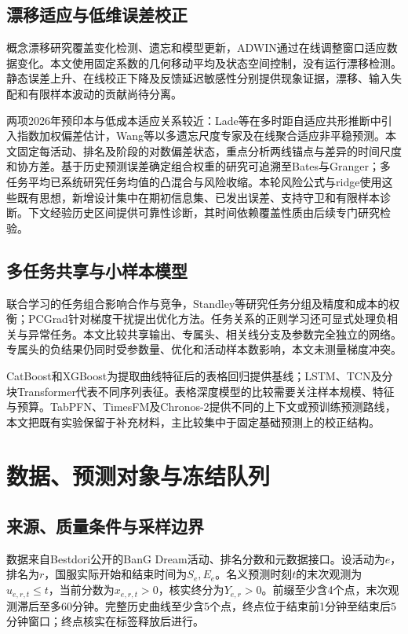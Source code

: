 \documentclass[preprint,12pt]{elsarticle}
\begin{document}
\subsection{漂移适应与低维误差校正}
概念漂移研究覆盖变化检测、遗忘和模型更新\citep{gama2014drift}，ADWIN通过在线调整窗口适应数据变化\citep{bifet2007adwin}。本文使用固定系数的几何移动平均\citep{roberts1959ewma}及状态空间控制\citep{kalman1960filter}，没有运行漂移检测。静态误差上升、在线校正下降及反馈延迟敏感性分别提供现象证据，漂移、输入失配和有限样本波动的贡献尚待分离。

两项2026年预印本与低成本适应关系较近：Lade等在多时距自适应共形推断中引入指数加权偏差估计\citep{lade2026bcaci}，Wang等以多遗忘尺度专家及在线聚合适应非平稳预测\citep{wang2026melo}。本文固定每活动、排名及阶段的对数偏差状态，重点分析两线锚点与差异的时间尺度和协方差。基于历史预测误差确定组合权重的研究可追溯至Bates与Granger\citep{bates1969combination}；多任务平均已系统研究任务均值的凸混合与风险收缩\citep{feldman2014averaging}。本轮风险公式与ridge使用这些既有思想，新增设计集中在期初信息集、已发出误差、支持守卫和有限样本诊断。下文经验历史区间提供可靠性诊断，其时间依赖覆盖性质由后续专门研究检验。

\subsection{多任务共享与小样本模型}
联合学习的任务组合影响合作与竞争，Standley等研究任务分组及精度和成本的权衡\citep{standley2020tasks}；PCGrad针对梯度干扰提出优化方法\citep{yu2020pcgrad}。任务关系的正则学习还可显式处理负相关与异常任务\citep{zhang2010relationships}。本文比较共享输出、专属头、相关线分支及参数完全独立的网络。专属头的负结果仍同时受参数量、优化和活动样本数影响，本文未测量梯度冲突。

CatBoost和XGBoost为提取曲线特征后的表格回归提供基线\citep{prokhorenkova2018catboost,chen2016xgboost}；LSTM、TCN及分块Transformer代表不同序列表征\citep{hochreiter1997lstm,bai2018tcn,nie2023patchtst}。表格深度模型的比较需要关注样本规模、特征与预算\citep{grinsztajn2022tabular}。TabPFN、TimesFM及Chronos-2提供不同的上下文或预训练预测路线\citep{hollmann2025tabpfn,das2024timesfm,ansari2025chronos2}，本文把既有实验保留于补充材料，主比较集中于固定基础预测上的校正结构。

\section{数据、预测对象与冻结队列}
\subsection{来源、质量条件与采样边界}
数据来自Bestdori公开的BanG Dream活动、排名分数和元数据接口\citep{bestdori2026data}。设活动为\(e\)，排名为\(r\)，国服实际开始和结束时间为\(S_e,E_e\)。名义预测时刻\(t\)的末次观测为\(u_{e,r,t}\le t\)，当前分数为\(x_{e,r,t}>0\)，核实终分为\(Y_{e,r}>0\)。前缀至少含4个点，末次观测滞后至多60分钟。完整历史曲线至少含5个点，终点位于结束前1分钟至结束后5分钟窗口；终点核实在标签释放后进行。
\end{document}

